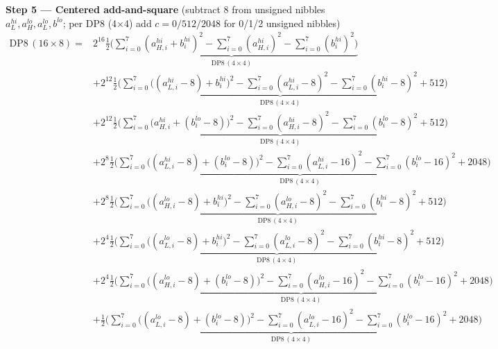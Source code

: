 \documentclass[fleqn]{article}
\newcommand{\DPop}[3]{\mathrm{DP#1}\,(#2\!\times\!#3)}
\begin{document}
\textbf{Step 5 --- Centered add-and-square}\quad
{\small(subtract $8$ from unsigned nibbles $a_L^{hi},a_H^{lo},a_L^{lo},b^{lo}$; per DP8 (4$\times$4) add $c=0/512/2048$ for 0/1/2 unsigned nibbles)}
\begin{align*}
\DPop{8}{16}{8} = {}
  & 2^{16}\underbrace{\tfrac12\Big(\sum_{i=0}^{7}(a_{H,i}^{hi}{+}b_i^{hi})^2 - \sum_{i=0}^{7}(a_{H,i}^{hi})^2 - \sum_{i=0}^{7}(b_i^{hi})^2\Big)}_{\DPop{8}{4}{4}} \\[0.5em]
  & + 2^{12}\underbrace{\tfrac12\Big(\sum_{i=0}^{7}\big((a_{L,i}^{hi}{-}8){+}b_i^{hi}\big)^2 - \sum_{i=0}^{7}(a_{L,i}^{hi}{-}8)^2 - \sum_{i=0}^{7}(b_i^{hi}{-}8)^2 + 512\Big)}_{\DPop{8}{4}{4}} \\[0.5em]
  & + 2^{12}\underbrace{\tfrac12\Big(\sum_{i=0}^{7}\big(a_{H,i}^{hi}{+}(b_i^{lo}{-}8)\big)^2 - \sum_{i=0}^{7}(a_{H,i}^{hi}{-}8)^2 - \sum_{i=0}^{7}(b_i^{lo}{-}8)^2 + 512\Big)}_{\DPop{8}{4}{4}} \\[0.5em]
  & + 2^{8}\underbrace{\tfrac12\Big(\sum_{i=0}^{7}\big((a_{L,i}^{hi}{-}8){+}(b_i^{lo}{-}8)\big)^2 - \sum_{i=0}^{7}(a_{L,i}^{hi}{-}16)^2 - \sum_{i=0}^{7}(b_i^{lo}{-}16)^2 + 2048\Big)}_{\DPop{8}{4}{4}} \\[0.5em]
  & + 2^{8}\underbrace{\tfrac12\Big(\sum_{i=0}^{7}\big((a_{H,i}^{lo}{-}8){+}b_i^{hi}\big)^2 - \sum_{i=0}^{7}(a_{H,i}^{lo}{-}8)^2 - \sum_{i=0}^{7}(b_i^{hi}{-}8)^2 + 512\Big)}_{\DPop{8}{4}{4}} \\[0.5em]
  & + 2^{4}\underbrace{\tfrac12\Big(\sum_{i=0}^{7}\big((a_{L,i}^{lo}{-}8){+}b_i^{hi}\big)^2 - \sum_{i=0}^{7}(a_{L,i}^{lo}{-}8)^2 - \sum_{i=0}^{7}(b_i^{hi}{-}8)^2 + 512\Big)}_{\DPop{8}{4}{4}} \\[0.5em]
  & + 2^{4}\underbrace{\tfrac12\Big(\sum_{i=0}^{7}\big((a_{H,i}^{lo}{-}8){+}(b_i^{lo}{-}8)\big)^2 - \sum_{i=0}^{7}(a_{H,i}^{lo}{-}16)^2 - \sum_{i=0}^{7}(b_i^{lo}{-}16)^2 + 2048\Big)}_{\DPop{8}{4}{4}} \\[0.5em]
  & + \underbrace{\tfrac12\Big(\sum_{i=0}^{7}\big((a_{L,i}^{lo}{-}8){+}(b_i^{lo}{-}8)\big)^2 - \sum_{i=0}^{7}(a_{L,i}^{lo}{-}16)^2 - \sum_{i=0}^{7}(b_i^{lo}{-}16)^2 + 2048\Big)}_{\DPop{8}{4}{4}}
\end{align*}
\end{document}
